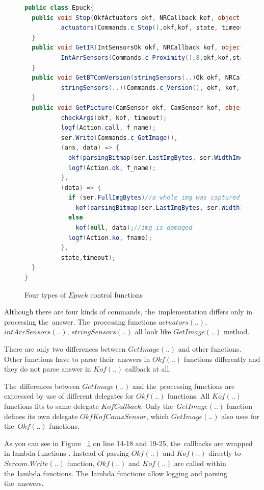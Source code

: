 \begin{figure}[!hbp]
\begin{lstlisting}[language=cs]
public class Epuck{
  public void Stop(OkfActuators okf, NRCallback kof, object state, double timeout) {
          actuators(Commands.c_Stop(),okf,kof, state, timeout, "Stop(..)");
  }
  public void GetIR(IntSensorsOk okf, NRCallback kof, object state, double timeout) {
          IntArrSensors(Commands.c_Proximity(),8,okf,kof,state,timeout,"GetIR(..)");
  }
  public void GetBTComVersion(stringSensors(..)Ok okf, NRCallback kof, object state, double timeout) {
          stringSensors(..)(Commands.c_Version(), okf, kof, state, timeout, "BTComVersion(..)");
  }
  public void GetPicture(CamSensor okf, CamSensor kof, object state, double timeout) {
          checkArgs(okf, kof, timeout);
          logf(Action.call, f_name);
          ser.Write(Commands.c_GetImage(),
          (ans, data) => {
            okf(parsingBitmap(ser.LastImgBytes, ser.WidthImg, ser.HeightImg, ser.ModeImg), data);
            logf(Action.ok, f_name);
          },
          (data) => {
            if (ser.FullImgBytes)//a whole img was captured
              kof(parsingBitmap(ser.LastImgBytes, ser.WidthImg, ser.HeightImg, ser.ModeImg), data);
            else
              kof(null, data);//img is demaged
            logf(Action.ko, fname);
          },
          state,timeout);		
  }	   
}
\end{lstlisting}
\caption{Four types of $Epuck$ control functions}
\label{publicep}	
\end{figure}

  Although there are four kinds of commands, the~implementation differs only in processing the~answer.
  The~processing functions $actuators(..)$, $intArrSensors(..)$, $stringSensors(..)$ all 
  look like $GetImage(..)$ method.
  
  There are only two differences between $GetImage(..)$ and other functions.
  Other functions have to parse their~answers in $Okf(..)$ functions differently and they do not parse
  answer in $Kof(..)$ callback at all.

  The~differences between $GetImage(..)$ and the~processing functions are expressed by use of different
  delegates for $Okf(..)$ functions. All $Kof(..)$ functions fits to same delegate $KofCallback$. 
  Only the~$GetImage(..)$ function defines its own delegate $OkfKofCamsSensor$, 
  which $GetImage(..)$ also uses for the~$Okf(..)$ functions.
  
  \begin{remark}
  As you can see in Figure ~\ref{publicep} on line 14-18 and 19-25,
  the~callbacks are wrapped in lambda functions \cite{lambda}.
  Instead of passing $Okf(..)$ and $Kof(..)$ directly to $Sercom.Write(..)$ function,
  $Okf(..)$ and $Kof(..)$  are called within the~lambda functions.
  The~lambda functions allow logging and parsing the~answers.
  \end{remark}

